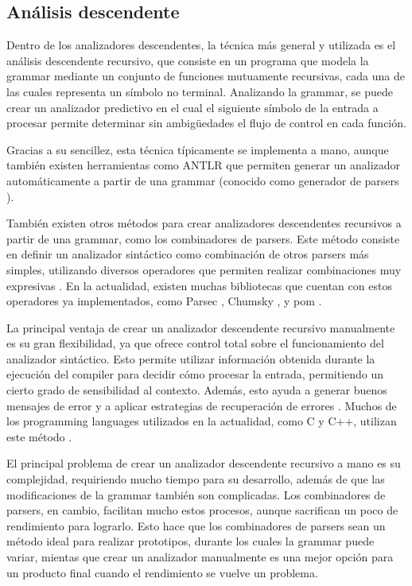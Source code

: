 \subsection{Análisis descendente}

Dentro de los analizadores descendentes, la técnica más general y utilizada es
el análisis descendente recursivo, que consiste en un programa que modela la
\gls{grammar} mediante un conjunto de funciones mutuamente recursivas, cada una
de las cuales representa un símbolo no terminal. Analizando la \gls{grammar}, se
puede crear un analizador predictivo en el cual el siguiente símbolo de la
entrada a procesar permite determinar sin ambigüedades el flujo de control en
cada función. \parencite{dragon-book}

Gracias a su sencillez, esta técnica típicamente se implementa a mano, aunque
también existen herramientas como ANTLR \parencite{ANTLR} que permiten generar
un analizador automáticamente a partir de una \gls{grammar} (conocido como
generador de \glspl{parser} \parencite{dragon-book}).

También existen otros métodos para crear analizadores descendentes
recursivos a partir de una \gls{grammar}, como los combinadores de
\glspl{parser}. Este método consiste en definir un analizador sintáctico como
combinación de otros \glspl{parser} más simples, utilizando diversos operadores
que permiten realizar combinaciones muy expresivas
\parencite{parser-combinators}. En la actualidad, existen muchas bibliotecas que
cuentan con estos operadores ya implementados, como Parsec \parencite{parsec}, Chumsky
\parencite{chumsky}, y pom \parencite{pom}.

La principal ventaja de crear un analizador descendente recursivo manualmente es su
gran flexibilidad, ya que ofrece control total sobre el funcionamiento del
analizador sintáctico. Esto permite utilizar información obtenida durante la
ejecución del \gls{compiler} para decidir cómo procesar la entrada, permitiendo
un cierto grado de sensibilidad al contexto. Además, esto ayuda a generar buenos
mensajes de error y a aplicar estrategias de recuperación de errores
\parencite{errors-clang}. Muchos de los \glspl{programming language} utilizados
en la actualidad, como C y C++, utilizan este método
\parencite{parser-types-survey}.

El principal problema de crear un analizador descendente recursivo a mano es su
complejidad, requiriendo mucho tiempo para su desarrollo, además de que las
modificaciones de la \gls{grammar} también son complicadas. Los combinadores de
\glspl{parser}, en cambio, facilitan mucho estos procesos, aunque sacrifican un
poco de rendimiento para lograrlo. Esto hace que los combinadores de
\glspl{parser} sean un método ideal para realizar prototipos, durante los cuales
la \gls{grammar} puede variar, mientas que crear un analizador manualmente es
una mejor opción para un producto final cuando el rendimiento se vuelve un
problema.

